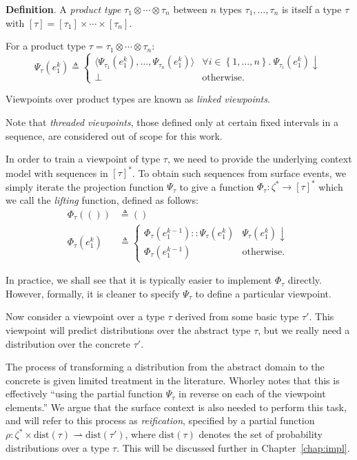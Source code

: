 \documentclass[12pt,a4paper,twoside,openright]{report}
\newcommand{\set}[1]{ \left\{ #1 \right\} }
\begin{document}
\textbf{Definition}. A \emph{product type} $\tau_1 \otimes \cdots \otimes
\tau_n$ between $n$ types $\tau_1, \ldots, \tau_n$ is itself a type $\tau$ with
$[\tau] = [\tau_1] \times \cdots \times [\tau_n]$. 

For a product type $\tau = \tau_1 \otimes \cdots \otimes \tau_n$:
$$ \Psi_\tau(e_1^k) \triangleq
\begin{cases}
  \langle\Psi_{\tau_1}(e_1^k), \ldots, \Psi_{\tau_n}(e_1^k)\rangle & \forall i
  \in \set{1,\ldots,n}.\
  \Psi_{\tau_i}(e_1^k)\downarrow \\
  \bot & \text{otherwise.}
\end{cases}
$$

Viewpoints over product types are known as \emph{linked viewpoints}. 

Note that \emph{threaded viewpoints}, those defined only at certain fixed
intervals in a sequence, are considered out of scope for this work.

In order to train a viewpoint of type $\tau$, we need to provide the
underlying context model with sequences in $[\tau]^*$. To obtain such sequences
from surface events, we simply iterate the projection function $\Psi_\tau$ to
give a function $\Phi_\tau : \zeta^* \rightarrow [\tau]^*$ which we call the
\emph{lifting} function, defined as follows:
\begin{align*}
  \Phi_\tau(()) &\triangleq () \\
  \Phi_\tau(e_1^k) &\triangleq \begin{cases}
    \Phi_\tau(e_1^{k-1})::\Psi_\tau(e_1^k) & \Psi_\tau(e_1^k)\downarrow \\
    \Phi_\tau(e_1^{k-1}) & \text{otherwise.}
  \end{cases}
\end{align*}

In practice, we shall see that it is typically easier to implement $\Phi_\tau$
directly. However, formally, it is cleaner to specify $\Psi_\tau$ to define a
particular viewpoint.

Now consider a viewpoint over a type $\tau$ derived from some basic type
$\tau'$. This viewpoint will predict distributions over the abstract type
$\tau$, but we really need a distribution over the concrete $\tau'$. 

The process of transforming a distribution from the abstract domain to the
concrete is given limited treatment in the literature. Whorley
\cite{whorley2013phd} notes that this is effectively ``using the partial
function $\Psi_\tau$ in reverse on each of the viewpoint elements.'' We argue
that the surface context is also needed to perform this task, and will refer to
this process as \emph{reification}, specified by a partial function $\rho :
\zeta^* \times \mathrm{dist}(\tau) \rightharpoonup \mathrm{dist}(\tau')$, where
$\mathrm{dist}(\tau)$ denotes the set of probability distributions over a type
$\tau$. This will be discussed further in Chapter~\ref{chap:impl}.
\end{document}
